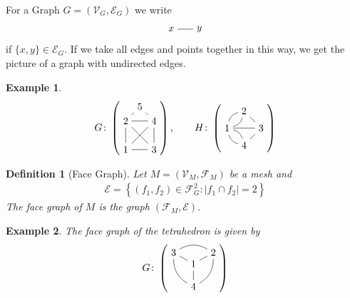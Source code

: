 \documentclass{article}
\newtheorem{defi}{Definition}
\newtheorem{ex}{Example}
\newcommand{\V}{\mathcal{V}}
\newcommand{\E}{\mathcal{E}}
\begin{document}
For a Graph $G=(\V_G,\E_G)$ we write
\begin{align*}
    \vcenter{\hbox{\begin{tikzpicture}
    \node (A) at (0,0) {$x$};
    \node (B) at (1,0) {$y$};
    \draw[-] (A) -- (B);\end{tikzpicture}}}
\end{align*}
if $\{x,y\}\in\E_G$. If we take all edges and points together in this way, we get the picture
of a graph with undirected edges.
\begin{ex}
    \begin{equation}\label{eq:sample_g}
    G\colon\left(\vcenter{\hbox{\begin{tikzpicture}[scale=0.5]
    \node (1) at (-1,-1) {$1$};
    \node (2) at (-1,1) {$2$};
    \node (3) at (1,-1) {$3$};
    \node (4) at (1,1) {$4$};
    \node (5) at (0,2) {$5$};
    \draw[-] (1) -- (2);
    \draw[-] (2) -- (3);
    \draw[-] (3) -- (4);
    \draw[-] (4) -- (2);
    \draw[-] (2) -- (5);
    \draw[-] (5) -- (4);
    \draw[-] (4) -- (1);
    \draw[-] (1) -- (3);
\end{tikzpicture}}}\right),\qquad H\colon\left(\vcenter{\hbox{\begin{tikzpicture}[scale=0.6]
\node (1) at (-1, 0) {$1$};
\node (2) at (0, 1) {$2$};
\node (3) at (1,0) {$3$};
\node (4) at (0,-1) {$4$};
\draw[-] (1) -- (3);
\path [-] (1) edge[bend right=-30](2); 
\path [-] (1) edge[bend right=30](2); 
\path [-] (1) edge[bend right=-30](4); 
\path [-] (1) edge[bend right=30](4);
\draw[-] (3) -- (2);
\draw[-] (4) -- (3);
\end{tikzpicture}}}\right)
\end{equation}
\end{ex}
\begin{defi}[Face Graph]
    Let $M = (\mathcal{V}_M, \mathcal{F}_M)$ be a mesh and
    \begin{align*}
        \mathcal{E} = \left\{(f_1,f_2)\in\mathcal{F}_G^2: \vert f_1\cap f_2\vert =2\right\}
    \end{align*}
    The face graph of $M$ is the graph $(\mathcal{F}_M,\mathcal{E})$.
\end{defi}
\begin{ex} The face graph of the tetrahedron is given by
    \begin{equation}\label{eq:sample_g}
    G\colon\left(\vcenter{\hbox{\begin{tikzpicture}[scale=0.8]
    \node (1) at (0,0) {$1$};
    \node (2) at (0.87,0.5) {$2$};
    \node (3) at (-0.87,0.5) {$3$};
    \node (4) at (0,-1) {$4$};
    \draw[-] (1) -- (2);
    \draw[-] (1) -- (3);
    \draw[-] (1) -- (4);
    \path[-] (2) edge[bend right=30] (3);
    \path[-] (3) edge[bend right=30] (4);
    \path[-] (4) edge[bend right=30] (2);
\end{tikzpicture}}}\right)
\end{equation}
\end{ex}
\end{document}

